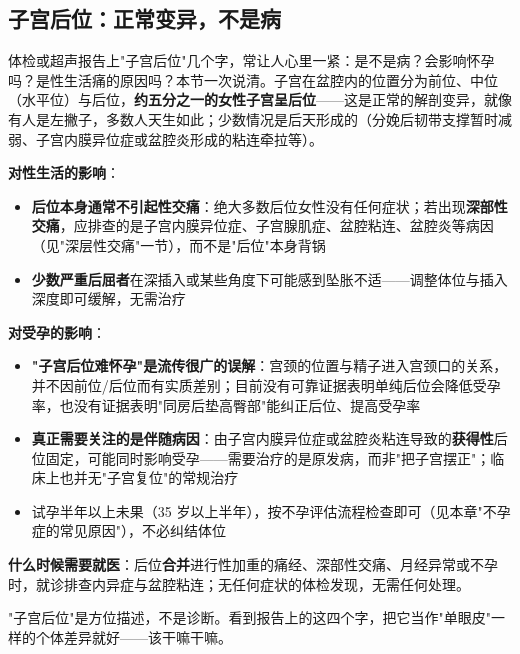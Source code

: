 \subsection{子宫后位：正常变异，不是病}

体检或超声报告上"子宫后位"几个字，常让人心里一紧：是不是病？会影响怀孕吗？是性生活痛的原因吗？本节一次说清。子宫在盆腔内的位置分为前位、中位（水平位）与后位，\textbf{约五分之一的女性子宫呈后位}——这是正常的解剖变异，就像有人是左撇子，多数人天生如此；少数情况是后天形成的（分娩后韧带支撑暂时减弱、子宫内膜异位症或盆腔炎形成的粘连牵拉等）。

\vspace{0.5em}
\noindent\textbf{对性生活的影响}：

\begin{itemize}
	\item \textbf{后位本身通常不引起性交痛}：绝大多数后位女性没有任何症状；若出现\textbf{深部性交痛}，应排查的是子宫内膜异位症、子宫腺肌症、盆腔粘连、盆腔炎等病因（见"深层性交痛"一节），而不是"后位"本身背锅
	\item \textbf{少数严重后屈者}在深插入或某些角度下可能感到坠胀不适——调整体位与插入深度即可缓解，无需治疗
\end{itemize}

\vspace{0.5em}
\noindent\textbf{对受孕的影响}：

\begin{itemize}
	\item \textbf{"子宫后位难怀孕"是流传很广的误解}：宫颈的位置与精子进入宫颈口的关系，并不因前位/后位而有实质差别；目前没有可靠证据表明单纯后位会降低受孕率，也没有证据表明"同房后垫高臀部"能纠正后位、提高受孕率
	\item \textbf{真正需要关注的是伴随病因}：由子宫内膜异位症或盆腔炎粘连导致的\textbf{获得性}后位固定，可能同时影响受孕——需要治疗的是原发病，而非"把子宫摆正"；临床上也并无"子宫复位"的常规治疗
	\item 试孕半年以上未果（35 岁以上半年），按不孕评估流程检查即可（见本章"不孕症的常见原因"），不必纠结体位
\end{itemize}

\vspace{0.5em}
\noindent\textbf{什么时候需要就医}：后位\textbf{合并}进行性加重的痛经、深部性交痛、月经异常或不孕时，就诊排查内异症与盆腔粘连；无任何症状的体检发现，无需任何处理。

\begin{tcolorbox}[colback=pink!5!white,colframe=red!50!black,title=贴心小叮咛]
"子宫后位"是方位描述，不是诊断。看到报告上的这四个字，把它当作"单眼皮"一样的个体差异就好——该干嘛干嘛。
\end{tcolorbox}
